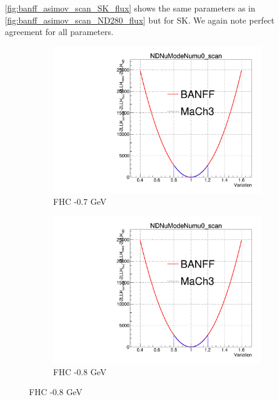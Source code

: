 \autoref{fig:banff_asimov_scan_SK_flux} shows the same parameters as in \autoref{fig:banff_asimov_scan_ND280_flux} but for SK. We again note perfect agreement for all parameters.
\begin{figure}[h]
	\begin{subfigure}[t]{0.24\textwidth}
		\includegraphics[width=\textwidth, trim={0mm 0mm 0mm 11mm}, clip, page=54]{figures/mach3/banff/Asimov_scan_20July_flux_Full_LLHscan_18July_BeRPA_U_ND280logL_scan}
		\caption{FHC -0.7 GeV}
	\end{subfigure}
	\begin{subfigure}[t]{0.24\textwidth}
		\includegraphics[width=\textwidth, trim={0mm 0mm 0mm 11mm}, clip, page=69]{figures/mach3/banff/Asimov_scan_20July_flux_Full_LLHscan_18July_BeRPA_U_ND280logL_scan}
		\caption{FHC -0.8 GeV}

\end{subfigure}
\end{figure}
